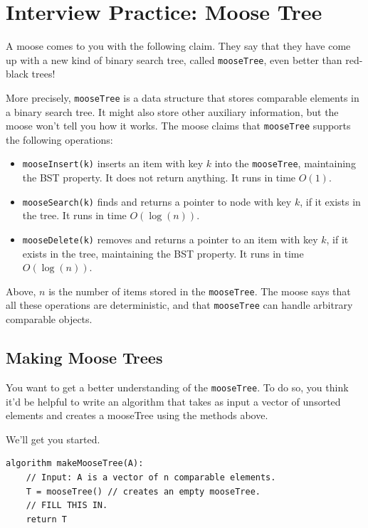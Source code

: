 \documentclass [12pt]{article}
\begin{document}
\section{Interview Practice: Moose Tree } 

A moose comes to you with the following claim. They say that they have come up with a new kind of binary search tree, called \texttt{mooseTree}, even better than red-black trees! 

More precisely, \texttt{mooseTree} is a data structure that stores comparable elements in a binary search tree. It might also store other auxiliary information, but the moose won't tell you how it works. The moose claims that \texttt{mooseTree} supports the following operations: 

\begin{itemize} 
    \item \texttt{mooseInsert(k)} inserts an item with key $k$ into the \texttt{mooseTree}, maintaining the BST property. It does not return anything. It runs in time $O(1)$. 
    \item \texttt{mooseSearch(k)} finds and returns a pointer to node with key $k$, if it exists in the tree. It runs in time $O(\log (n))$. 
    \item \texttt{mooseDelete(k)} removes and returns a pointer to an item with key $k$, if it exists in the tree, maintaining the BST property. It runs in time $O(\log (n))$. 
\end{itemize} 

Above, $n$ is the number of items stored in the \texttt{mooseTree}. The moose says that all these operations are deterministic, and that \texttt{mooseTree} can handle arbitrary comparable objects. 


\subsection{Making Moose Trees }

You want to get a better understanding of the \texttt{mooseTree}. To do so, you think it'd be helpful to write an algorithm that takes as input a vector of unsorted elements and creates a mooseTree using the methods above. 


We'll get you started.
\begin{verbatim}
algorithm makeMooseTree(A):
    // Input: A is a vector of n comparable elements.
    T = mooseTree() // creates an empty mooseTree.
    // FILL THIS IN.
    return T
\end{verbatim}
\end{document}
